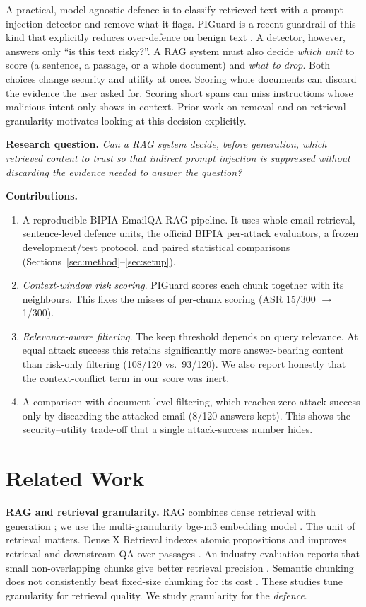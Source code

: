 \documentclass[conference]{IEEEtran}
\begin{document}
A practical, model-agnostic defence is to classify retrieved text with a
prompt-injection detector and remove what it flags. PIGuard is a recent
guardrail of this kind that explicitly reduces over-defence on benign text
\cite{piguard2025}. A detector, however, answers only ``is this text
risky?''. A RAG system must also decide \emph{which unit} to score (a
sentence, a passage, or a whole document) and \emph{what to drop}. Both
choices change security and utility at once. Scoring whole documents can
discard the evidence the user asked for. Scoring short spans can miss
instructions whose malicious intent only shows in context. Prior work on
removal \cite{chen2025detect,promptlocate} and on retrieval granularity
\cite{densex} motivates looking at this decision explicitly.

\textbf{Research question.} \emph{Can a RAG system decide, before
generation, which retrieved content to trust so that indirect prompt
injection is suppressed without discarding the evidence needed to answer
the question?}

\textbf{Contributions.}
\begin{enumerate}
\item A reproducible BIPIA EmailQA RAG pipeline. It uses whole-email
retrieval, sentence-level defence units, the official BIPIA per-attack
evaluators, a frozen development/test protocol, and paired statistical
comparisons (Sections~\ref{sec:method}--\ref{sec:setup}).
\item \emph{Context-window risk scoring}. PIGuard scores each chunk
together with its neighbours. This fixes the misses of per-chunk scoring
(ASR 15/300 $\rightarrow$ 1/300).
\item \emph{Relevance-aware filtering}. The keep threshold depends on query
relevance. At equal attack success this retains significantly more
answer-bearing content than risk-only filtering (108/120 vs.\ 93/120). We
also report honestly that the context-conflict term in our score was inert.
\item A comparison with document-level filtering, which reaches zero
attack success only by discarding the attacked email (8/120 answers kept).
This shows the security--utility trade-off that a single attack-success
number hides.
\end{enumerate}

\section{Related Work}
\label{sec:related}
\textbf{RAG and retrieval granularity.} RAG combines dense retrieval with
generation \cite{lewis2020,karpukhin2020}; we use the multi-granularity
bge-m3 embedding model \cite{bgem3}. The unit of retrieval matters. Dense X
Retrieval indexes atomic propositions and improves retrieval and downstream
QA over passages \cite{densex}. An industry evaluation reports that small
non-overlapping chunks give better retrieval precision \cite{chroma2024}.
Semantic chunking does not consistently beat fixed-size chunking for its
cost \cite{qu2024}. These studies tune granularity for retrieval quality.
We study granularity for the \emph{defence}.
\end{document}
